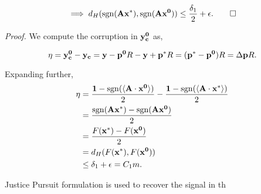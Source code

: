 $$
\implies d_H(\mathrm{sgn}({\mathbf{Ax^*}}), \mathrm{sgn}({\mathbf{Ax^0}})) \leq \frac{\delta_1}{2} + \epsilon.
\qed
$$




\textit{Proof.} We compute the corruption in $\mathbf{y_c^0}$ as,

$$
\eta = \mathbf{y_c^0 - y_c} = \mathbf{y} - \mathbf{p^0}R - \mathbf{y} + \mathbf{p^*}R = (\mathbf{p^*-p^0})R = \Delta\mathbf{p}R.
$$

Expanding further,
\begin{align*}
\eta  & = \frac{\mathbf{1}-\mathrm{sgn}(\langle \mathbf{A} \cdot \mathbf{x^0} \rangle)}{2} -  \frac{\mathbf{1}-\mathrm{sgn}(\langle \mathbf{A} \cdot \mathbf{x^*} \rangle)}{2} \\
& = \frac{\mathrm{sgn}({\mathbf{Ax^*}})- \mathrm{sgn}({\mathbf{Ax^0}})}{2} \\
& = \frac{F\mathbf{(x^*)} - F\mathbf{(x^0)}}{2} \\
& = d_H(F\mathbf{(x^*)}, F\mathbf{(x^0)}) \\
& \leq \delta_1 + \epsilon = C_1m.
\end{align*}

Justice Pursuit formulation is used to recover the signal in th